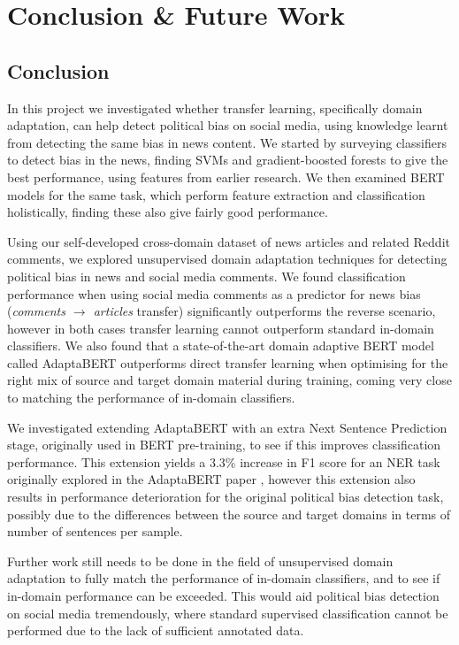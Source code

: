 \chapter{Conclusion \& Future Work}

\section{Conclusion}

In this project we investigated whether transfer learning, specifically domain adaptation, can help detect political bias on social media, using knowledge learnt from detecting the same bias in news content. We started by surveying classifiers to detect bias in the news, finding SVMs and gradient-boosted forests to give the best performance, using features from earlier research. We then examined BERT models for the same task, which perform feature extraction and classification holistically, finding these also give fairly good performance.

Using our self-developed cross-domain dataset of news articles and related Reddit comments, we explored unsupervised domain adaptation techniques for detecting political bias in news and social media comments. We found classification performance when using social media comments as a predictor for news bias (\textit{comments $ \rightarrow $ articles} transfer) significantly outperforms the reverse scenario, however in both cases transfer learning cannot outperform standard in-domain classifiers. We also found that a state-of-the-art domain adaptive BERT model called AdaptaBERT outperforms direct transfer learning when optimising for the right mix of source and target domain material during training, coming very close to matching the performance of in-domain classifiers.

We investigated extending AdaptaBERT with an extra Next Sentence Prediction stage, originally used in BERT pre-training, to see if this improves classification performance. This extension yields a 3.3\% increase in F1 score for an NER task originally explored in the AdaptaBERT paper \cite{adaptabert}, however this extension also results in performance deterioration for the original political bias detection task, possibly due to the differences between the source and target domains in terms of number of sentences per sample.

Further work still needs to be done in the field of unsupervised domain adaptation to fully match the performance of in-domain classifiers, and to see if in-domain performance can be exceeded. This would aid political bias detection on social media tremendously, where standard supervised classification cannot be performed due to the lack of sufficient annotated data.

